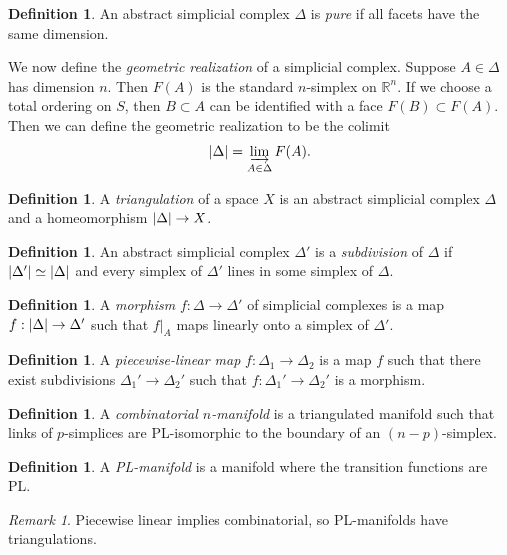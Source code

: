 \documentclass[leqno, openany]{memoir}
\theoremstyle{definition}
\newtheorem{defn}[thm]{Definition}
\theoremstyle{remark}
\newtheorem{rmk}[thm]{Remark}
\theoremstyle{plain}
\theoremstyle{definition}
\theoremstyle{remark}
\newcommand{\R}{\mathbb{R}}
\begin{document}
\begin{defn} An abstract simplicial complex $\Delta$ is \textit{pure} if all
facets have the same dimension.  \end{defn}

We now define the \textit{geometric realization} of a simplicial complex.
Suppose $A \in \Delta$ has dimension $n$. Then $F(A)$ is the standard
$n$-simplex on $\R^n$. If we choose a total ordering on $S$, then $B \subset A$
can be identified with a face $F(B) \subset F(A)$. Then we can define the
geometric realization to be the colimit \[ \abs{\Delta} = \varinjlim_{A \in
\Delta} F(A). \]

\begin{defn} A \textit{triangulation} of a space $X$ is an abstract simplicial
complex $\Delta$ and a homeomorphism $\abs{\Delta} \to X$.  \end{defn}

\begin{defn} An abstract simplicial complex $\Delta'$ is a \textit{subdivision}
of $\Delta$ if $\abs{\Delta'} \simeq \abs{\Delta}$ and every simplex of
$\Delta'$ lines in some simplex of $\Delta$.  \end{defn}

\begin{defn} A \textit{morphism} $f: \Delta \to \Delta'$ of simplicial
complexes is a map $f: \abs{\Delta} \to \Delta'$ such that $f|_A$ maps linearly
onto a simplex of $\Delta'$.  \end{defn}

\begin{defn} A \textit{piecewise-linear map} $f: \Delta_1 \to \Delta_2$ is a
map $f$ such that there exist subdivisions $\Delta_1' \to \Delta_2'$ such that
$f: \Delta_1' \to \Delta_2'$ is a morphism.  \end{defn}

\begin{defn} A \textit{combinatorial $n$-manifold} is a triangulated manifold
such that links of $p$-simplices are PL-isomorphic to the boundary of an
$(n-p)$-simplex.  \end{defn}

\begin{defn} A \textit{PL-manifold} is a manifold where the transition
functions are PL.  \end{defn}

\begin{rmk} Piecewise linear implies combinatorial, so PL-manifolds have
triangulations.  \end{rmk}
\end{document}
